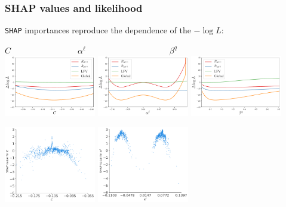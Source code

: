 \documentclass[mathserif, 10pt, dvipsnames]{beamer}
\begin{document}
\begin{frame}\frametitle{SHAP values and likelihood}
    \texttt{SHAP} importances reproduce the dependence of the $-\log L$:
    \begin{center}
        {\small \qquad\qquad$C\qquad\qquad\qquad\qquad \alpha^\ell \qquad\qquad\qquad\qquad\qquad\beta^q\qquad$} \\
        \includegraphics[width=0.30\textwidth]{figures/evoplot_C.pdf}
        \includegraphics[width=0.30\textwidth]{figures/evoplot_alphal.pdf}
        \includegraphics[width=0.30\textwidth]{figures/evoplot_betaq.pdf}
    \end{center}
    \begin{center}
        \includegraphics[width=0.30\textwidth]{figures/SHAP_C.pdf}
        \includegraphics[width=0.30\textwidth]{figures/SHAP_al.pdf}

\end{center}
\end{frame}
\end{document}
